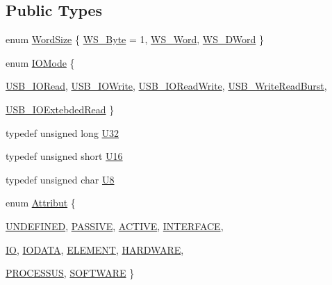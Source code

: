 \subsection*{Public Types}
\begin{DoxyCompactItemize}
\item 
enum \hyperlink{classUsbFTInterface_a057387f452eaac094fb77ba09cf1cf2e}{WordSize} \{ \hyperlink{classUsbFTInterface_a057387f452eaac094fb77ba09cf1cf2ea32efe2feb6728578134aa9b85b97d1b9}{WS\_\-Byte} = 1, 
\hyperlink{classUsbFTInterface_a057387f452eaac094fb77ba09cf1cf2ea83a39aef091bbcfb420ac32aafe55e0a}{WS\_\-Word}, 
\hyperlink{classUsbFTInterface_a057387f452eaac094fb77ba09cf1cf2eae8012559bbaaae91ac6208ed7b3ffe89}{WS\_\-DWord}
 \}
\item 
enum \hyperlink{classUsbFTInterface_ace858cb26e5a7e13f69074fae6bf8f4a}{IOMode} \{ \par
\hyperlink{classUsbFTInterface_ace858cb26e5a7e13f69074fae6bf8f4aab7035362547f3f742c3e4a3ab2c6a80e}{USB\_\-IORead}, 
\hyperlink{classUsbFTInterface_ace858cb26e5a7e13f69074fae6bf8f4aa01390a5571f202557191cbff67f80e67}{USB\_\-IOWrite}, 
\hyperlink{classUsbFTInterface_ace858cb26e5a7e13f69074fae6bf8f4aac918e2df35628e6be3d598bdf86d2e15}{USB\_\-IOReadWrite}, 
\hyperlink{classUsbFTInterface_ace858cb26e5a7e13f69074fae6bf8f4aafaeca70bd5113bd710b501699f399663}{USB\_\-WriteReadBurst}, 
\par
\hyperlink{classUsbFTInterface_ace858cb26e5a7e13f69074fae6bf8f4aa5cc7b52e259722b1c9a03d98bd06383c}{USB\_\-IOExtebdedRead}
 \}
\item 
typedef unsigned long \hyperlink{classUsbFTInterface_aee2201fe4d977aa03568fa8dbacc39ba}{U32}
\item 
typedef unsigned short \hyperlink{classUsbFTInterface_a51f8cba75a1b8eb42ba2c6ba3841f80f}{U16}
\item 
typedef unsigned char \hyperlink{classUsbFTInterface_a3b007566f8af758984d97ada2b9938d3}{U8}
\item 
enum \hyperlink{classAttrib_a69e171d7cc6417835a5a306d3c764235}{Attribut} \{ \par
\hyperlink{classAttrib_a69e171d7cc6417835a5a306d3c764235a3a8da2ab97dda18aebab196fe4100531}{UNDEFINED}, 
\hyperlink{classAttrib_a69e171d7cc6417835a5a306d3c764235a2bfb2af57b87031d190a05fe25dd92ed}{PASSIVE}, 
\hyperlink{classAttrib_a69e171d7cc6417835a5a306d3c764235a3b1fec929c0370d1436f2f06e298fb0d}{ACTIVE}, 
\hyperlink{classAttrib_a69e171d7cc6417835a5a306d3c764235aa27c16b480a369ea4d18b07b2516bbc7}{INTERFACE}, 
\par
\hyperlink{classAttrib_a69e171d7cc6417835a5a306d3c764235a1420a5b8c0540b2af210b6975eded7f9}{IO}, 
\hyperlink{classAttrib_a69e171d7cc6417835a5a306d3c764235a0af3b0d0ac323c1704e6c69cf90add28}{IODATA}, 
\hyperlink{classAttrib_a69e171d7cc6417835a5a306d3c764235a7788bc5dd333fd8ce18562b269c9dab1}{ELEMENT}, 
\hyperlink{classAttrib_a69e171d7cc6417835a5a306d3c764235a61ceb22149f365f1780d18f9d1459423}{HARDWARE}, 
\par
\hyperlink{classAttrib_a69e171d7cc6417835a5a306d3c764235a75250e29692496e73effca2c0330977f}{PROCESSUS}, 
\hyperlink{classAttrib_a69e171d7cc6417835a5a306d3c764235a103a67cd0b8f07ef478fa45d4356e27b}{SOFTWARE}
 \}
\end{DoxyCompactItemize}
